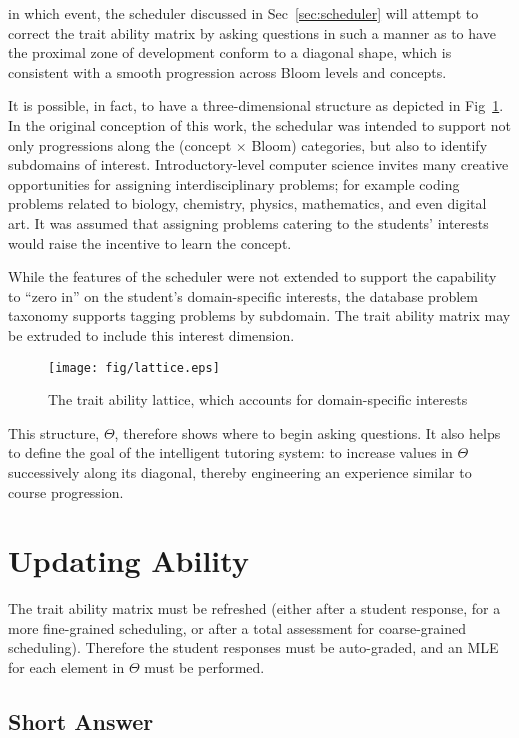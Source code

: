 in which event, the scheduler discussed in Sec~\ref{sec:scheduler} will attempt
to correct the trait ability matrix by asking questions in such a manner as to
have the proximal zone of development conform to a diagonal shape, which is
consistent with a smooth progression across Bloom levels and concepts.

It is possible, in fact, to have a three-dimensional structure as depicted in
Fig~\ref{fig:lattice}.  In the original conception of this work, the schedular
was intended to support not only progressions along the (concept $\times$
Bloom) categories, but also to identify subdomains of interest.
Introductory-level computer science invites many creative opportunities for
assigning interdisciplinary problems; for example coding problems related to
biology, chemistry, physics, mathematics, and even digital art.  It was assumed
that assigning problems catering to the students' interests would raise the
incentive to learn the concept.  

While the features of the scheduler were not extended to support the capability
to ``zero in'' on the student's domain-specific interests, the database problem
taxonomy supports tagging problems by subdomain.  The trait ability matrix may
be extruded to include this interest dimension.

\begin{figure}[p!]
 \label{fig:lattice}
 \texttt{[image: fig/lattice.eps]} 
 \caption{The trait ability lattice, which accounts for domain-specific 
  interests}
\end{figure}

This structure, $\Theta$, therefore shows where to begin asking questions.  It
also helps to define the goal of the intelligent tutoring system: to increase
values in $\Theta$ successively along its diagonal, thereby engineering an
experience similar to course progression.

\section{Updating Ability}

The trait ability matrix must be refreshed (either after a student response,
for a more fine-grained scheduling, or after a total assessment for
coarse-grained scheduling).  Therefore the student responses must be
auto-graded, and an MLE for each element in $\Theta$ must be performed.

\subsection{Short Answer}

